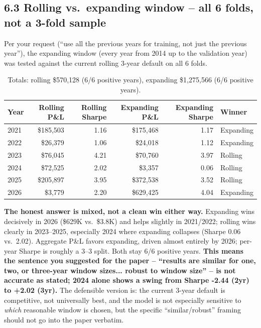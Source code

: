 \documentclass[11pt]{article}
\begin{document}
\subsection*{6.3 Rolling vs.\ expanding window -- all 6 folds, not a 3-fold sample}
Per your request (``use all the previous years for training, not just the previous year''), the expanding
window (every year from 2014 up to the validation year) was tested against the current rolling 3-year
default on all 6 folds.
\begin{table}[H]
\centering
\begin{tabular}{lrrrrl}
\toprule
Year & Rolling P\&L & Rolling Sharpe & Expanding P\&L & Expanding Sharpe & Winner \\
\midrule
2021 & \$185,503 & 1.16 & \$175,468 & 1.17 & Expanding \\
2022 & \$26,379 & 1.06 & \$24,018 & 1.12 & Expanding \\
2023 & \$76,045 & 4.21 & \$70,760 & 3.97 & Rolling \\
2024 & \$72,525 & 2.02 & \$3,357 & 0.06 & Rolling \\
2025 & \$205,897 & 3.95 & \$372,538 & 3.52 & Rolling \\
2026 & \$3,779 & 2.20 & \$629,425 & 4.04 & Expanding \\
\bottomrule
\end{tabular}
\caption{Totals: rolling \$570,128 (6/6 positive years), expanding
\$1,275,566 (6/6 positive years).}
\end{table}
\textbf{The honest answer is mixed, not a clean win either way.} Expanding wins decisively in 2026
(\$629K vs.\ \$3.8K) and helps slightly in 2021/2022; rolling wins clearly in 2023--2025, especially 2024
where expanding collapses (Sharpe 0.06 vs.\ 2.02). Aggregate P\&L favors expanding, driven almost entirely
by 2026; per-year Sharpe is roughly a 3--3 split. Both stay 6/6 positive years. \textbf{This means the
sentence you suggested for the paper -- ``results are similar for one, two, or three-year window sizes...
robust to window size'' -- is not accurate as stated; 2024 alone shows a swing from Sharpe -2.44 (2yr) to
+2.02 (3yr).} The defensible version is: the current 3-year default is competitive, not universally best,
and the model is not especially sensitive to \emph{which} reasonable window is chosen, but the specific
``similar/robust'' framing should not go into the paper verbatim.
\end{document}
